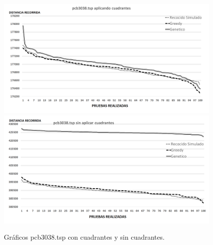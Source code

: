  \begin{figure}[hbtp]
    \centering
        \includegraphics[width=1\textwidth]{PruebasResultados/Experimentos_Graficos_Con/pcb3038.png}
        \includegraphics[width=1\textwidth]{PruebasResultados/Experimentos_Graficos_Sin/pcb3038.png}
        \caption{Gráficos pcb3038.tsp con cuadrantes y sin cuadrantes.}
        \label{fig:pcb3038_grafica.png}
\end{figure}
\newpage

